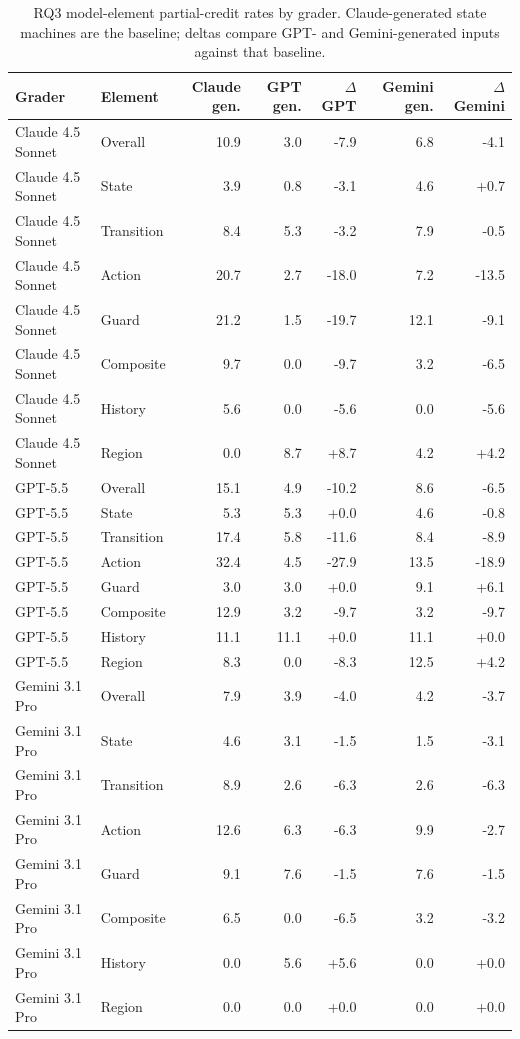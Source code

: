 \begin{table}[t]
\centering
\small
\caption{RQ3 model-element partial-credit rates by grader. Claude-generated state machines are the baseline; deltas compare GPT- and Gemini-generated inputs against that baseline.}
\label{tab:rq3-element-partial-credit-rates}
\begin{tabular}{llrrrrr}
\toprule
Grader & Element & Claude gen. & GPT gen. & $\Delta$ GPT & Gemini gen. & $\Delta$ Gemini \\
\midrule
Claude 4.5 Sonnet & Overall & 10.9 & 3.0 & -7.9 & 6.8 & -4.1 \\
Claude 4.5 Sonnet & State & 3.9 & 0.8 & -3.1 & 4.6 & +0.7 \\
Claude 4.5 Sonnet & Transition & 8.4 & 5.3 & -3.2 & 7.9 & -0.5 \\
Claude 4.5 Sonnet & Action & 20.7 & 2.7 & -18.0 & 7.2 & -13.5 \\
Claude 4.5 Sonnet & Guard & 21.2 & 1.5 & -19.7 & 12.1 & -9.1 \\
Claude 4.5 Sonnet & Composite & 9.7 & 0.0 & -9.7 & 3.2 & -6.5 \\
Claude 4.5 Sonnet & History & 5.6 & 0.0 & -5.6 & 0.0 & -5.6 \\
Claude 4.5 Sonnet & Region & 0.0 & 8.7 & +8.7 & 4.2 & +4.2 \\
GPT-5.5 & Overall & 15.1 & 4.9 & -10.2 & 8.6 & -6.5 \\
GPT-5.5 & State & 5.3 & 5.3 & +0.0 & 4.6 & -0.8 \\
GPT-5.5 & Transition & 17.4 & 5.8 & -11.6 & 8.4 & -8.9 \\
GPT-5.5 & Action & 32.4 & 4.5 & -27.9 & 13.5 & -18.9 \\
GPT-5.5 & Guard & 3.0 & 3.0 & +0.0 & 9.1 & +6.1 \\
GPT-5.5 & Composite & 12.9 & 3.2 & -9.7 & 3.2 & -9.7 \\
GPT-5.5 & History & 11.1 & 11.1 & +0.0 & 11.1 & +0.0 \\
GPT-5.5 & Region & 8.3 & 0.0 & -8.3 & 12.5 & +4.2 \\
Gemini 3.1 Pro & Overall & 7.9 & 3.9 & -4.0 & 4.2 & -3.7 \\
Gemini 3.1 Pro & State & 4.6 & 3.1 & -1.5 & 1.5 & -3.1 \\
Gemini 3.1 Pro & Transition & 8.9 & 2.6 & -6.3 & 2.6 & -6.3 \\
Gemini 3.1 Pro & Action & 12.6 & 6.3 & -6.3 & 9.9 & -2.7 \\
Gemini 3.1 Pro & Guard & 9.1 & 7.6 & -1.5 & 7.6 & -1.5 \\
Gemini 3.1 Pro & Composite & 6.5 & 0.0 & -6.5 & 3.2 & -3.2 \\
Gemini 3.1 Pro & History & 0.0 & 5.6 & +5.6 & 0.0 & +0.0 \\
Gemini 3.1 Pro & Region & 0.0 & 0.0 & +0.0 & 0.0 & +0.0 \\
\bottomrule
\end{tabular}
\end{table}
